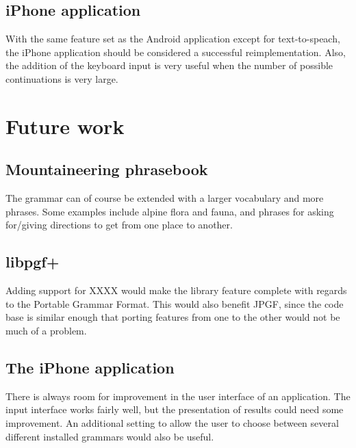 \subsection{iPhone application}
With the same feature set as the Android application except for text-to-speach, the iPhone application should be considered a successful reimplementation. Also, the addition of the keyboard input is very useful when the number of possible continuations is very large.


\section{Future work}


\subsection{Mountaineering phrasebook}
The grammar can of course be extended with a larger vocabulary and more phrases. Some examples include alpine flora and fauna, and phrases for asking for/giving directions to get from one place to another.


\subsection{libpgf+}
Adding support for XXXX would make the library feature complete with regards to the Portable Grammar Format. This would also benefit JPGF, since the code base is similar enough that porting features from one to the other would not be much of a problem.


\subsection{The iPhone application}
There is always room for improvement in the user interface of an application. The input interface works fairly well, but the presentation of results could need some improvement. An additional setting to allow the user to choose between several different installed grammars would also be useful.
